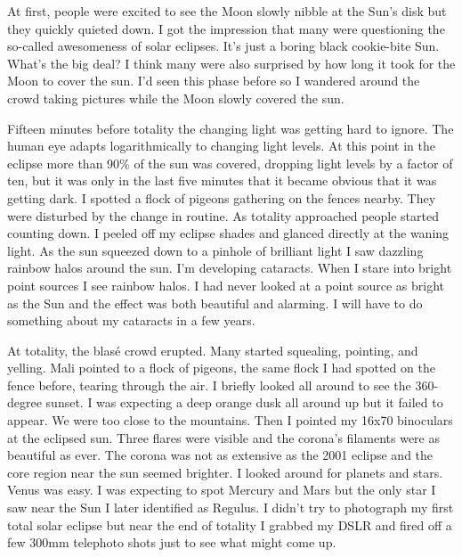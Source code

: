 At first, people were excited to see the Moon slowly nibble at the Sun's
disk but they quickly quieted down. I got the impression that many were
questioning the so-called awesomeness of solar eclipses. It's just a
boring black cookie-bite Sun. What's the big deal? I think many were
also surprised by how long it took for the Moon to cover the sun. I'd
seen this phase before so I wandered around the crowd taking pictures
while the Moon slowly covered the sun.

Fifteen minutes before totality the changing light was getting hard to
ignore. The human eye adapts logarithmically to changing light levels.
At this point in the eclipse more than 90\% of the sun was covered,
dropping light levels by a factor of ten, but it was only in the last
five minutes that it became obvious that it was getting dark. I spotted
a flock of pigeons gathering on the fences nearby. They were disturbed
by the change in routine. As totality approached people started counting
down. I peeled off my eclipse shades and glanced directly at the waning
light. As the sun squeezed down to a pinhole of brilliant light I saw
dazzling rainbow halos around the sun. I'm developing cataracts. When I
stare into bright point sources I see rainbow halos. I had never looked
at a point source as bright as the Sun and the effect was both beautiful
and alarming. I will have to do something about my cataracts in a few
years.


At totality, the blasé crowd erupted. Many started squealing, pointing,
and yelling. Mali pointed to a flock of pigeons, the same flock I had
spotted on the fence before, tearing through the air. I briefly looked
all around to see the 360-degree sunset. I was expecting a deep orange
dusk all around up but it failed to appear. We were too close to the
mountains. Then I pointed my 16x70 binoculars at the eclipsed sun. Three
flares were visible and the corona's filaments were as beautiful as
ever. The corona was not as extensive as the 2001 eclipse and the core
region near the sun seemed brighter. I looked around for planets and
stars. Venus was easy. I was expecting to spot Mercury and Mars but
the only star I saw near the Sun I later identified as Regulus. I didn't
try to photograph my first total solar eclipse but near the end of
totality I grabbed my DSLR and fired off a few 300mm telephoto shots
just to see what might come up.


